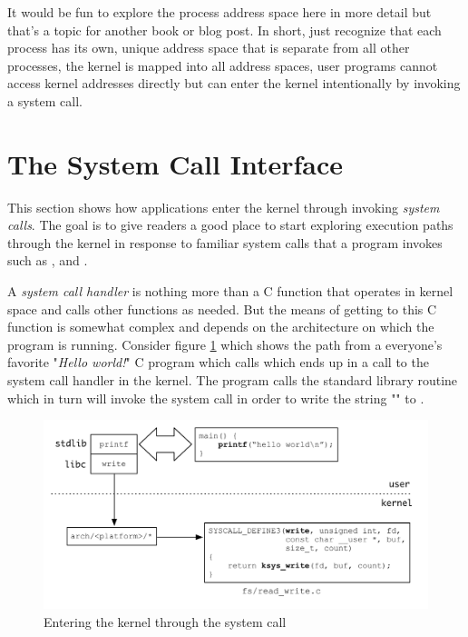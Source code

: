 It would be fun to explore the process address space here in more detail but that's a topic for another book or blog post. In short, just recognize that each process has its own, unique address space that is separate from all other processes, the kernel is mapped into all address spaces, user programs cannot access kernel addresses directly but can enter the kernel intentionally by invoking a system call.


\section{The System Call Interface}\label{syscalls}

This section shows how applications enter the kernel through invoking \textit{system calls}. The goal is to give readers a good place to start exploring execution paths through the kernel in response to familiar system calls that a program invokes such as ,  and .

A \textit{system call handler} is nothing more than a C function that operates in kernel space and calls other functions as needed. But the means of getting to this C function is somewhat complex and depends on the architecture on which the program is running. Consider figure \ref{fig:syscall-kernel} which shows the path from a everyone's favorite "\textit{Hello world!}" C program which calls  which ends up in a call to the  system call handler in the kernel. The program calls the standard library routine  which in turn will invoke the  system call in order to write the string "" to .

\begin{figure}
	\includegraphics[scale=0.6]{figures/syscall-kernel.pdf}
	\centering
	\caption{Entering the kernel through the  system call}
	\label{fig:syscall-kernel}
\end{figure}

